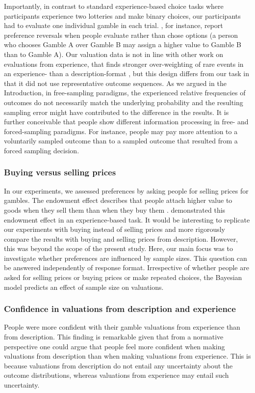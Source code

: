 \documentclass[a4paper, man, natbib, floatsintext]{apa6}
\begin{document}
Importantly, in contrast to standard experience-based choice tasks where participants experience two lotteries and make binary choices, our participants had to evaluate one individual gamble in each trial. \cite{Lichtenstein1971}, for instance, report preference reversals when people evaluate rather than chose options (a person who chooses Gamble A over Gamble B may assign a higher value to Gamble B than to Gamble A). Our valuation data is not in line with other work on evaluations from experience, that finds stronger over-weighting of rare events in an experience- than a description-format \citep{Golan2014}, but this design differs from our task in that it did not use representative outcome sequences. As we argued in the Introduction, in free-sampling paradigms, the experienced relative frequencies of outcomes do not necessarily match the underlying probability and the resulting sampling error might have contributed to the difference in the results. It is further conceivable that people show different information processing in free- and forced-sampling paradigms. For instance, people may pay more attention to a voluntarily sampled outcome than to a sampled outcome that resulted from a forced sampling decision.

\subsubsection{Buying versus selling prices}
In our experiments, we assessed preferences by asking people for selling prices for gambles. 
The endowment effect describes that people attach higher value to goods when they sell them than when they buy them \citep{Thaler1980}. \cite{Pachur2012} demonstrated this endowment effect in an experience-based task. It would be interesting to replicate our experiments with buying instead of selling prices and more rigorously compare the results with buying and selling prices from description. However, this was beyond the scope of the present study. Here, our main focus was to investigate whether preferences are influenced by sample sizes. This question can be answered independently of response format. Irrespective of whether people are asked for selling prices or buying prices or make repeated choices, the Bayesian model predicts an effect of sample size on valuations. 

\subsubsection{Confidence in valuations from description and experience}
People were more confident with their gamble valuations from experience than from description. This finding is remarkable given that from a normative perspective one could argue that people feel more confident when making valuations from description than when making valuations from experience. This is because valuations from description do not entail any uncertainty about the outcome distributions, whereas valuations from experience may entail such uncertainty.
\end{document}
